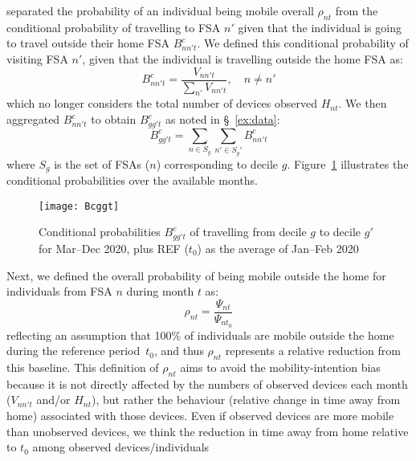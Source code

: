 separated the probability of an individual being mobile overall $\rho_{nt}$ from
the conditional probability of travelling to FSA $n'$
given that the individual is going to travel outside their home FSA $B^c_{nn't}$.
We defined this conditional probability of visiting FSA $n'$,
given that the individual is travelling outside the home FSA as:
\begin{equation}
  B^c_{nn't} = \frac{V_{nn't}}{\sum_{n'} V_{nn't}},\quad n \ne n'
\end{equation}
which no longer considers the total number of devices observed $H_{nt}$.
We then aggregated $B^c_{nn't}$ to obtain $B^c_{gg't}$
as noted in \S~\ref{ex:data}:
\begin{equation}\label{eq:Bgg.app}
  B^c_{gg't} = \sum_{n \in S_g}\sum_{n' \in S_g'} B^c_{nn't}
\end{equation}
where $S_g$ is the set of FSAs ($n$) corresponding to decile $g$.
Figure~\ref{fig:Bcggt} illustrates the conditional probabilities over the available months.
\begin{figure}
  \centering
  \texttt{[image: Bcggt]}
  \caption{Conditional probabilities $B^c_{gg't}$ of
      travelling from decile $g$ to decile $g'$
      for Mar--Dec 2020, plus REF ($t_0$) as the average of Jan--Feb 2020}
  \label{fig:Bcggt}
\end{figure}
\par
Next, we defined the overall probability of being mobile outside the home
for individuals from FSA $n$ during month $t$ as:
\begin{equation}
  \rho_{nt} = \frac{\Psi_{nt}}{\Psi_{nt_0}}
\end{equation}
reflecting an assumption that
100\% of individuals are mobile outside the home during the reference period~$t_0$,
and thus $\rho_{nt}$ represents a relative reduction from this baseline.
This definition of $\rho_{nt}$ aims to avoid the mobility-intention bias
because it is not directly affected by the numbers of observed devices each month
($V_{nn't}$ and/or $H_{nt}$), but rather
the behaviour (relative change in time away from home) associated with those devices.
Even if observed devices are more mobile than unobserved devices,
we think the reduction in time away from home relative to $t_0$
among observed devices/individuals
